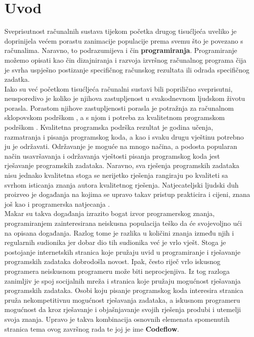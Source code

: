 \documentclass[times, utf8, zavrsni]{fer}
\begin{document}
\chapter{Uvod}
Sveprisutnost računalnih sustava tijekom početka drugog tisućljeća uveliko je doprinijela većem porastu zanimacije populacije prema svemu što je povezano s računalima.  Naravno, to podrazumijeva i čin \textbf{programiranja}. Programiranje možemo opisati kao čin dizajniranja i razvoja izvršnog računalnog programa čija je svrha uspješno postizanje specifičnog računskog rezultata ili odrada specifičnog zadatka.\\
Iako su već početkom tisućljeća računalni sustavi bili poprilično sveprisutni, neusporedivo je koliko je njihova zastupljenost u svakodnevnom ljudskom životu porasla. Porastom njihove zastupljenosti porasla je potražnja za računalnom sklopovskom podrškom , a s njom i potreba za kvalitetnom programskom podrškom . Kvalitetna programska podrška rezultat je godina učenja, razmatranja i pisanja programskog koda, a kao i svaku drugu vještinu potrebno ju je održavati. Održavanje je moguće na mnogo načina, a podosta popularan način usavršavanja i održavanja vještosti pisanja programskog koda jest rješavanje programskih zadataka. Naravno, sva rješenja programskih zadataka nisu jednako kvalitetna stoga se nerijetko rješenja rangiraju po kvaliteti sa svrhom isticanja znanja autora kvalitetnog rješenja. Natjecateljski ljudski duh proizveo je događanja na kojima se upravo takav pristup prakticira i cijeni, znana još kao i programerska natjecanja .\\
Makar su takva događanja izrazito bogat izvor programerskog znanja, programiranjem zainteresirana neiskusna populacija teško da će svojevoljno ući na opisana događanja. Razlog tome je razlika u količini znanja između njih i regularnih sudionika jer dobar dio tih sudionika već je vrlo vješt. Stoga je postojanje internetskih stranica koje pružaju uvid u programiranje i rješavanje programskih zadataka dobrodošla novost. Ipak, često riječ vrlo iskusnog programera neiskusnom programeru može biti neprocjenjiva. Iz tog razloga zanimljiv je spoj socijalnih mreža  i stranica koje pružaju mogućnost rješavanja programskih zadataka. Osobi koju pisanje programskog koda interesira stranica pruža nekompetitivnu mogućnost rješavanja zadataka, a iskusnom programeru mogućnost da kroz rješavanje i objašnjavanje svojih rješenja produbi i utemelji svoja znanja. Upravo je takva kombinacija osnovnih elemenata  spomenutih stranica tema ovog završnog rada te joj je ime \textbf{Codeflow}.
\end{document}
